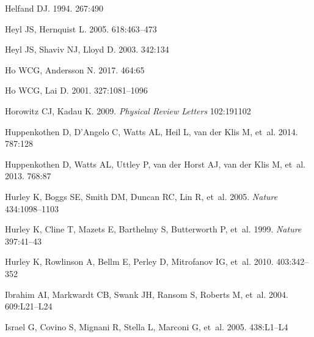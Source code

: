 \documentclass[letterpaper]{ar-1col}
\begin{document}
\begin{thebibliography}{}
Helfand DJ. 1994.
\textit{\mnras} 267:490

{Heyl} JS, {Hernquist} L. 2005.
\textit{\apj} 618:463--473

Heyl JS, Shaviv NJ, Lloyd D. 2003.
\textit{\mnras} 342:134

{Ho} WCG, {Andersson} N. 2017.
\textit{\mnras} 464:65

{Ho} WCG, {Lai} D. 2001.
\textit{\mnras} 327:1081--1096

{Horowitz} CJ, {Kadau} K. 2009.
\textit{Physical Review Letters} 102:191102

{Huppenkothen} D, {D'Angelo} C, {Watts} AL, {Heil} L, {van der Klis} M, et~al.
  2014.
\textit{\apj} 787:128

{Huppenkothen} D, {Watts} AL, {Uttley} P, {van der Horst} AJ, {van der Klis} M,
  et~al. 2013.
\textit{\apj} 768:87

{Hurley} K, {Boggs} SE, {Smith} DM, {Duncan} RC, {Lin} R, et~al. 2005.
\textit{Nature} 434:1098--1103

Hurley K, Cline T, Mazets E, Barthelmy S, Butterworth P, et~al. 1999.
\textit{Nature} 397:41--43

{Hurley} K, {Rowlinson} A, {Bellm} E, {Perley} D, {Mitrofanov} IG, et~al. 2010.
\textit{\mnras} 403:342--352

{Ibrahim} AI, {Markwardt} CB, {Swank} JH, {Ransom} S, {Roberts} M, et~al. 2004.
\textit{\apj} 609:L21--L24

{Israel} G, {Covino} S, {Mignani} R, {Stella} L, {Marconi} G, et~al.
  2005{}.
\textit{\aap} 438:L1--L4


\end{thebibliography}
\end{document}
